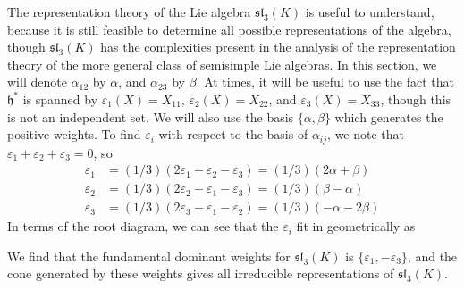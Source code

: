 The representation theory of the Lie algebra $\mathfrak{sl}_3(K)$ is useful to understand, because it is still feasible to determine all possible representations of the algebra, though $\mathfrak{sl}_3(K)$ has the complexities present in the analysis of the representation theory of the more general class of semisimple Lie algebras. In this section, we will denote $\alpha_{12}$ by $\alpha$, and $\alpha_{23}$ by $\beta$. At times, it will be useful to use the fact that $\mathfrak{h}^*$ is spanned by $\varepsilon_1(X) = X_{11}$, $\varepsilon_2(X) = X_{22}$, and $\varepsilon_3(X) = X_{33}$, though this is not an independent set. We will also use the basis $\{ \alpha, \beta \}$ which generates the positive weights. To find $\varepsilon_i$ with respect to the basis of $\alpha_{ij}$, we note that $\varepsilon_1 + \varepsilon_2 + \varepsilon_3 = 0$, so
%
\begin{align*}
    \varepsilon_1 &= (1/3)(2\varepsilon_1 - \varepsilon_2 - \varepsilon_3) = (1/3)(2 \alpha + \beta)\\
    \varepsilon_2 &= (1/3)(2\varepsilon_2 - \varepsilon_1 - \varepsilon_3) = (1/3)(\beta - \alpha)\\
    \varepsilon_3 &= (1/3)(2\varepsilon_3 - \varepsilon_1 - \varepsilon_2) = (1/3)(-\alpha -2\beta)
\end{align*}
%
In terms of the root diagram, we can see that the $\varepsilon_i$ fit in geometrically as
    \begin{center}
  \end{center}
%
We find that the fundamental dominant weights for $\mathfrak{sl}_3(K)$ is $\{ \varepsilon_1, -\varepsilon_3 \}$, and the cone generated by these weights gives all irreducible representations of $\mathfrak{sl}_3(K)$.

